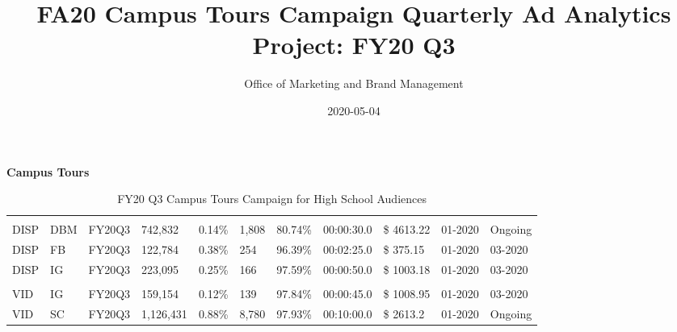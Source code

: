 \documentclass[
  11pt,
]{article}
\title{FA20 Campus Tours Campaign Quarterly Ad Analytics Project: FY20 Q3}
\author{Office of Marketing and Brand Management}
\date{2020-05-04}
\begin{document}
\maketitle

\textbf{Campus Tours}

\begin{landscape}\begin{table}

\caption{\label{tab:unnamed-chunk-4}FY20 Q3 Campus Tours Campaign for High School Audiences}
\centering
\begin{tabu} to 
\toprule
{} &  &  &  &  &  &  &  &  &  & \\
\midrule
\addlinespace[0.3em]
\\
\hspace{1em}DISP & DBM & FY20Q3 & 742,832 & 0.14\% & 1,808 & 80.74\% & 00:00:30.0 & \$ 4613.22 & 01-2020 & Ongoing\\
\hspace{1em}DISP & FB & FY20Q3 & 122,784 & 0.38\% & 254 & 96.39\% & 00:02:25.0 & \$ 375.15 & 01-2020 & 03-2020\\
\hspace{1em}DISP & IG & FY20Q3 & 223,095 & 0.25\% & 166 & 97.59\% & 00:00:50.0 & \$ 1003.18 & 01-2020 & 03-2020\\
\addlinespace[0.3em]
\\
\hspace{1em}VID & IG & FY20Q3 & 159,154 & 0.12\% & 139 & 97.84\% & 00:00:45.0 & \$ 1008.95 & 01-2020 & 03-2020\\
\hspace{1em}VID & SC & FY20Q3 & 1,126,431 & 0.88\% & 8,780 & 97.93\% & 00:10:00.0 & \$ 2613.2 & 01-2020 & Ongoing\\
\bottomrule
\end{tabu}
\end{table}
\end{landscape}
\end{document}
